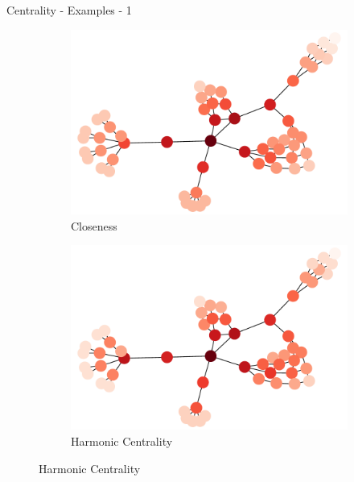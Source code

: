 \documentclass[a4paper,11pt]{book}
\begin{document}
\begin{textbox}{Centrality - Examples - 1}
\begin{figure}[H]
\begin{subfigure}{.5\textwidth}
\includegraphics[width=\textwidth]{pics/exampleCloseness.pdf}
    \caption{Closeness}
\end{subfigure}
\begin{subfigure}{.5\textwidth}
\includegraphics[width=\textwidth]{pics/exampleHarmonic.pdf}
    \caption{Harmonic Centrality}
\end{subfigure}

\end{figure}


\end{textbox}
\end{document}
